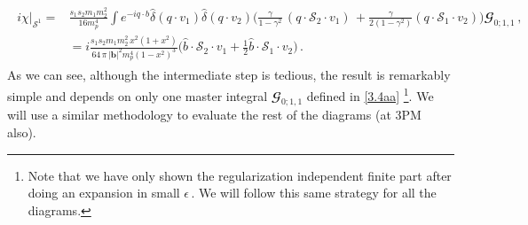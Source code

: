 \begin{align}
    \begin{split}
    i    \chi\Big|_{\mathcal{S}^1}=&\frac{s_1 s_2 m_1 m_2^2}{16m_p^4} \int e^{-iq\cdot b}\hat\delta(q\cdot v_1)\hat\delta(q\cdot v_2)\Bigg(\frac{\gamma}{1-\gamma^2}\,(q\cdot \mathcal{S}_2\cdot v_1)\,+\frac{\gamma}{2(1-\gamma^2)}(q\cdot \mathcal{S}_1\cdot v_2)\Bigg)\mathbfcal{G}_{0;1,1}\,,\\&
    =i\frac{ s_1 s_2 m_1 m_2^2\,x^2(1+x^2)}{64\, \pi\, |\boldsymbol{b}|^2 m_p^4\left(1-x^2\right)^3} \Big(\hat b\cdot \mathcal{S}_2\cdot v_1 +\frac{1}{2}\hat{b}\cdot \mathcal{S}_1\cdot v_2\Big)\,.
    \end{split}
\end{align}
As we can see, although the intermediate step is tedious, the result is remarkably simple and depends on only one master integral $\mathbfcal{G}_{0;1,1}$ defined in \eqref{3.4aa} \footnote{Note that we have only shown the regularization independent finite part after doing an expansion in small $\epsilon\,.$ We will follow this same strategy for all the diagrams.}. We will use a similar methodology to evaluate the rest of the diagrams (at 3PM also).

